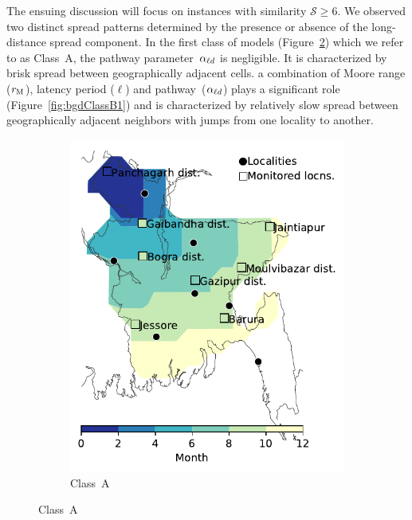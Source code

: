 \documentclass[11pt]{article}
\newcommand{\similarity}{\mathcal{S}}
\theoremstyle{definition}
\begin{document}
The ensuing discussion will focus on instances with similarity
$\similarity\ge6$. We observed two distinct spread patterns determined by
the presence or absence of the long-distance spread component. In the first
class of models (Figure~\ref{fig:bgdClassA}) which we refer to as Class~A,
the pathway parameter~$\alpha_{\ell d}$ is negligible. It is characterized by brisk
spread between geographically adjacent cells.  %
a combination of Moore range ($r_\mathrm{M}$), latency period ($\ell$) and
pathway~($\alpha_{\ell d}$) plays a significant role (Figure~\ref{fig:bgdClassB1}) and
is characterized by relatively slow spread between geographically adjacent
neighbors with jumps from one locality to another.
\begin{figure}[!ht]
    \centering
\begin{subfigure}[b]{.47\textwidth}
    \includegraphics[width=\textwidth]{../cellular_automata/results/contour/BGD_model-A.pdf}
    \caption{Class~A\label{fig:bgdClassA}}
\end{subfigure}\hspace{.5cm}

\end{figure}
\end{document}
